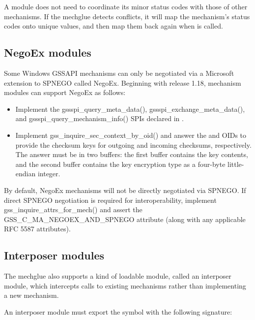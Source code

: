 \documentclass[letterpaper,10pt,english]{sphinxmanual}
\begin{document}
A module does not need to coordinate its minor status codes with those
of other mechanisms.  If the mechglue detects conflicts, it will map
the mechanism’s status codes onto unique values, and then map them
back again when  is called.


\subsection{NegoEx modules}
\label{\detokenize{plugindev/gssapi:negoex-modules}}
Some Windows GSSAPI mechanisms can only be negotiated via a Microsoft
extension to SPNEGO called NegoEx.  Beginning with release 1.18,
mechanism modules can support NegoEx as follows:
\begin{itemize}
\item {} 
Implement the gssspi\_query\_meta\_data(), gssspi\_exchange\_meta\_data(),
and gssspi\_query\_mechanism\_info() SPIs declared in
.

\item {} 
Implement gss\_inquire\_sec\_context\_by\_oid() and answer the
 and  OIDs
to provide the checksum keys for outgoing and incoming checksums,
respectively.  The answer must be in two buffers: the first buffer
contains the key contents, and the second buffer contains the key
encryption type as a four-byte little-endian integer.

\end{itemize}

By default, NegoEx mechanisms will not be directly negotiated via
SPNEGO.  If direct SPNEGO negotiation is required for
interoperability, implement gss\_inquire\_attrs\_for\_mech() and assert
the GSS\_C\_MA\_NEGOEX\_AND\_SPNEGO attribute (along with any applicable
RFC 5587 attributes).


\subsection{Interposer modules}
\label{\detokenize{plugindev/gssapi:interposer-modules}}
The mechglue also supports a kind of loadable module, called an
interposer module, which intercepts calls to existing mechanisms
rather than implementing a new mechanism.

An interposer module must export the symbol 
with the following signature:
\end{document}
